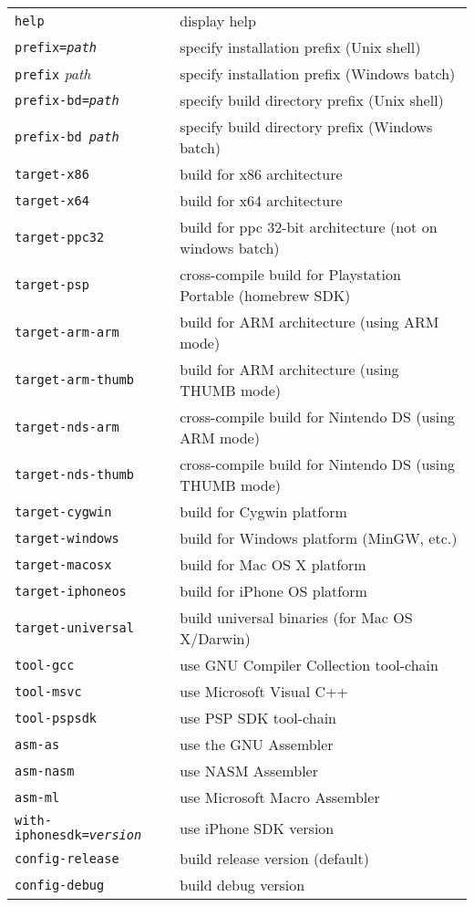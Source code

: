 \begin{enumerate}
\begin{tabular}{ll}	
{\tt help}                         & display help \\
{\tt prefix={\it path}}            & specify installation prefix (Unix shell) \\
{\tt prefix} {\it path}            & specify installation prefix (Windows batch) \\
{\tt prefix-bd={\it path}}         & specify build directory prefix (Unix shell) \\
{\tt prefix-bd {\it path}}         & specify build directory prefix (Windows batch) \\
{\tt target-x86}                   & build for x86 architecture \\
{\tt target-x64}                   & build for x64 architecture \\
{\tt target-ppc32}                 & build for ppc 32-bit architecture (not on windows batch)\\
{\tt target-psp}                   & cross-compile build for Playstation Portable (homebrew SDK)\\
{\tt target-arm-arm}               & build for ARM architecture (using ARM mode) \\
{\tt target-arm-thumb}             & build for ARM architecture (using THUMB mode) \\
{\tt target-nds-arm}               & cross-compile build for Nintendo DS (using ARM mode) \\
{\tt target-nds-thumb}             & cross-compile build for Nintendo DS (using THUMB mode) \\
{\tt target-cygwin}                & build for Cygwin platform \\
{\tt target-windows}               & build for Windows platform (MinGW, etc.) \\
{\tt target-macosx}                & build for Mac OS X platform \\
{\tt target-iphoneos}              & build for iPhone OS platform \\
{\tt target-universal}             & build universal binaries (for Mac OS X/Darwin) \\
{\tt tool-gcc}                     & use GNU Compiler Collection tool-chain \\
{\tt tool-msvc}                    & use Microsoft Visual C++ \\
{\tt tool-pspsdk}                  & use PSP SDK tool-chain \\
{\tt asm-as}                       & use the GNU Assembler \\
{\tt asm-nasm}                     & use NASM Assembler \\
{\tt asm-ml}                       & use Microsoft Macro Assembler \\
{\tt with-iphonesdk={\it version}} & use iPhone SDK version \\
{\tt config-release}               & build release version (default) \\
{\tt config-debug}                 & build debug version \\
\end{tabular}


\end{enumerate}
